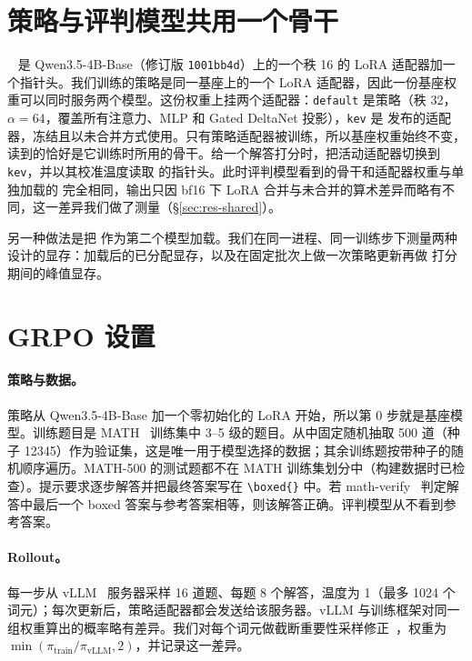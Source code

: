 
\section{策略与评判模型共用一个骨干}\label{sec:shared}

\kev{}~\cite{kev4b} 是 Qwen3.5-4B-Base（修订版 \texttt{1001bb4d}）上的一个秩 16 的 LoRA 适配器加一个指针头。我们训练的策略是同一基座上的一个 LoRA 适配器，因此一份基座权重可以同时服务两个模型。这份权重上挂两个适配器：\texttt{default} 是策略（秩 32，$\alpha=64$，覆盖所有注意力、MLP 和 Gated DeltaNet 投影），\texttt{kev} 是 \kev{} 发布的适配器，冻结且以未合并方式使用。只有策略适配器被训练，所以基座权重始终不变，\kev{} 读到的恰好是它训练时所用的骨干。给一个解答打分时，把活动适配器切换到 \texttt{kev}，并以其校准温度读取 \kev{} 的指针头。此时评判模型看到的骨干和适配器权重与单独加载的 \kev{} 完全相同，输出只因 bf16 下 LoRA 合并与未合并的算术差异而略有不同，这一差异我们做了测量（\S\ref{sec:res-shared}）。

另一种做法是把 \kev{} 作为第二个模型加载。我们在同一进程、同一训练步下测量两种设计的显存：加载后的已分配显存，以及在固定批次上做一次策略更新再做 \kev{} 打分期间的峰值显存。

\section{GRPO 设置}\label{sec:grpo}

\paragraph{策略与数据。} 策略从 Qwen3.5-4B-Base 加一个零初始化的 LoRA 开始，所以第 0 步就是基座模型。训练题目是 MATH~\cite{hendrycks2021math} 训练集中 3--5 级的题目。从中固定随机抽取 500 道（种子 12345）作为验证集，这是唯一用于模型选择的数据；其余训练题按带种子的随机顺序遍历。MATH-500 的测试题都不在 MATH 训练集划分中（构建数据时已检查）。提示要求逐步解答并把最终答案写在 \verb|\boxed{}| 中。若 math-verify~\cite{mathverify} 判定解答中最后一个 boxed 答案与参考答案相等，则该解答正确。评判模型从不看到参考答案。

\paragraph{Rollout。} 每一步从 vLLM~\cite{kwon2023vllm} 服务器采样 16 道题、每题 8 个解答，温度为 1（最多 1024 个词元）；每次更新后，策略适配器都会发送给该服务器。vLLM 与训练框架对同一组权重算出的概率略有差异。我们对每个词元做截断重要性采样修正~\cite{yao2025offpolicy}，权重为 $\min(\pi_{\text{train}}/\pi_{\text{vLLM}},2)$，并记录这一差异。

